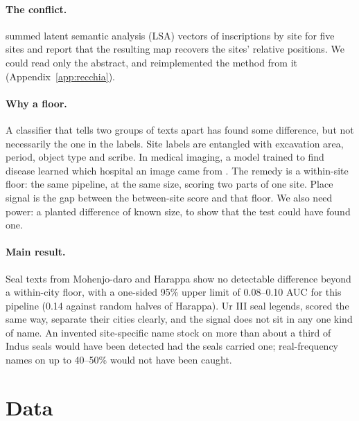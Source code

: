 \documentclass[11pt,a4paper]{article}
\begin{document}
\paragraph{The conflict.} \citet{recchia2016} summed latent semantic analysis (LSA) vectors of inscriptions by site for five sites and report that the resulting map recovers the sites' relative positions.
We could read only the abstract, and reimplemented the method from it (Appendix~\ref{app:recchia}).

\paragraph{Why a floor.} A classifier that tells two groups of texts apart has found some difference, but not necessarily the one in the labels.
Site labels are entangled with excavation area, period, object type and scribe.
In medical imaging, a model trained to find disease learned which hospital an image came from \citep{zech2018,kapoor2023}.
The remedy is a within-site floor: the same pipeline, at the same size, scoring two parts of one site.
Place signal is the gap between the between-site score and that floor.
We also need power: a planted difference of known size, to show that the test could have found one.

\paragraph{Main result.} Seal texts from Mohenjo-daro and Harappa show no detectable difference beyond a within-city floor, with a one-sided 95\% upper limit of 0.08--0.10 AUC for this pipeline (0.14 against random halves of Harappa). %
Ur III seal legends, scored the same way, separate their cities clearly, and the signal does not sit in any one kind of name.
An invented site-specific name stock on more than about a third of Indus seals would have been detected had the seals carried one; real-frequency names on up to 40--50\% would not have been caught. %

\section{Data}
\label{sec:data}
\end{document}
